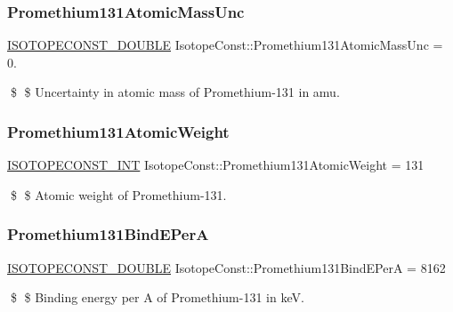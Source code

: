 \subsubsection{\texorpdfstring{Promethium131\+Atomic\+Mass\+Unc}{Promethium131AtomicMassUnc}}
{\footnotesize\ttfamily \mbox{\hyperlink{group___isotope_const-_macros_ga8f45a7272ce02c0b4c65c44636ed719a}{I\+S\+O\+T\+O\+P\+E\+C\+O\+N\+S\+T\+\_\+\+D\+O\+U\+B\+LE}} Isotope\+Const\+::\+Promethium131\+Atomic\+Mass\+Unc = 0.}

\$ \$ Uncertainty in atomic mass of Promethium-\/131 in amu. \mbox{\label{group___isotope_const-_promethium-_pm131_ga9905cd563902644bc898c0c083554215}} 
\subsubsection{\texorpdfstring{Promethium131\+Atomic\+Weight}{Promethium131AtomicWeight}}
{\footnotesize\ttfamily \mbox{\hyperlink{group___isotope_const-_macros_ga5f18360b3e99483a35c32d789e62621c}{I\+S\+O\+T\+O\+P\+E\+C\+O\+N\+S\+T\+\_\+\+I\+NT}} Isotope\+Const\+::\+Promethium131\+Atomic\+Weight = 131}

\$ \$ Atomic weight of Promethium-\/131. \mbox{\label{group___isotope_const-_promethium-_pm131_gac0632aecb368f5ff25d65caf24cecba6}} 
\subsubsection{\texorpdfstring{Promethium131\+Bind\+E\+PerA}{Promethium131BindEPerA}}
{\footnotesize\ttfamily \mbox{\hyperlink{group___isotope_const-_macros_ga8f45a7272ce02c0b4c65c44636ed719a}{I\+S\+O\+T\+O\+P\+E\+C\+O\+N\+S\+T\+\_\+\+D\+O\+U\+B\+LE}} Isotope\+Const\+::\+Promethium131\+Bind\+E\+PerA = 8162}

\$ \$ Binding energy per A of Promethium-\/131 in keV. \mbox{\label{group___isotope_const-_promethium-_pm131_gae15d59d03913161bdb0f02b85f0278fb}} 

